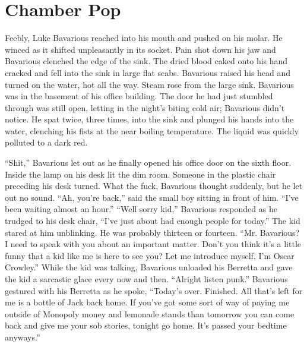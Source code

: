 \chapter{Chamber Pop}



Feebly, Luke Bavarious reached into his mouth and pushed on his
molar. He winced as it shifted unpleasantly in its socket. Pain
shot down his jaw and Bavarious clenched the edge of the sink. The
dried blood caked onto his hand cracked and fell into the sink in
large flat scabs. Bavarious raised his head and turned on the
water, hot all the way. Steam rose from the large sink. Bavarious
was in the basement of his office building. The door he had just
stumbled through was still open, letting in the night's
biting cold air; Bavarious didn't notice. He spat twice,
three times, into the sink and plunged his hands into the water,
clenching his fists at the near boiling temperature. The liquid was
quickly polluted to a dark red.



``Shit,'' Bavarious let out as he finally opened his
office door on the sixth floor. Inside the lamp on his desk lit the
dim room. Someone in the plastic chair preceding his desk turned.
What the fuck, Bavarious thought suddenly, but he let out no sound.
``Ah, you're back,'' said the small boy sitting in
front of him. ``I've been waiting almost an hour.''
``Well sorry kid,'' Bavarious responded as he trudged to
his desk chair, ``I've just about had enough people for
today.'' The kid stared at him unblinking. He was probably
thirteen or fourteen. ``Mr. Bavarious? I need to speak with
you about an important matter. Don't you think it's a
little funny that a kid like me is here to see you? Let me
introduce myself, I'm Oscar Crowley.'' While the kid was
talking, Bavarious unloaded his Berretta and gave the kid a
sarcastic glace every now and then. ``Alright listen
punk.'' Bavarious gestured with his Berretta as he spoke,
``Today's over. Finished. All that's left for me
is a bottle of Jack back home. If you've got some sort of way
of paying me outside of Monopoly money and lemonade stands than
tomorrow you can come back and give me your sob stories, tonight go
home. It's passed your bedtime anyways.''



